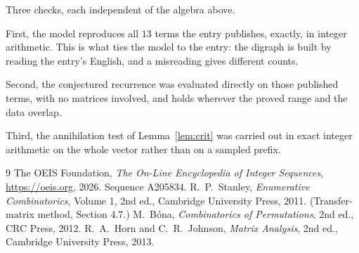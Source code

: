\documentclass[11pt,a4paper]{article}
\theoremstyle{plain}
\theoremstyle{definition}
\begin{document}
Three checks, each independent of the algebra above.

First, the model reproduces all $13$ terms the entry publishes, exactly, in integer
arithmetic. This is what ties the model to the entry: the digraph is built by reading the
entry's English, and a misreading gives different counts.

Second, the conjectured recurrence was evaluated directly on those published terms, with no
matrices involved, and holds wherever the proved range and the data overlap.

Third, the annihilation test of Lemma~\ref{lem:crit} was carried out in exact integer
arithmetic on the whole vector rather than on a sampled prefix.

\begin{thebibliography}{9}
 The OEIS Foundation, \emph{The On-Line Encyclopedia of Integer
Sequences}, \url{https://oeis.org}, 2026. Sequence A205834.
 R.~P.~Stanley, \emph{Enumerative Combinatorics}, Volume 1, 2nd ed.,
Cambridge University Press, 2011. (Transfer-matrix method, Section 4.7.)
 M.~B\'ona, \emph{Combinatorics of Permutations}, 2nd ed., CRC
Press, 2012.
 R.~A.~Horn and C.~R.~Johnson, \emph{Matrix Analysis}, 2nd ed., Cambridge
University Press, 2013.
\end{thebibliography}
\end{document}
